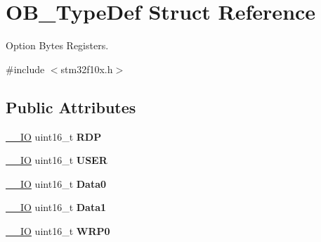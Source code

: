 \hypertarget{struct_o_b___type_def}{\section{O\-B\-\_\-\-Type\-Def Struct Reference}
\label{struct_o_b___type_def}
}


Option Bytes Registers.  




{\ttfamily \#include $<$stm32f10x.\-h$>$}

\subsection*{Public Attributes}
\begin{DoxyCompactItemize}
\item 
\hypertarget{struct_o_b___type_def_ad9f9ae594003c39cc27f147e29a130bb}{\hyperlink{group___c_m_s_i_s__core__definitions_gaec43007d9998a0a0e01faede4133d6be}{\-\_\-\-\_\-\-I\-O} uint16\-\_\-t {\bfseries R\-D\-P}}\label{struct_o_b___type_def_ad9f9ae594003c39cc27f147e29a130bb}

\item 
\hypertarget{struct_o_b___type_def_ab0292062a80446c97dac24604bd8ed8e}{\hyperlink{group___c_m_s_i_s__core__definitions_gaec43007d9998a0a0e01faede4133d6be}{\-\_\-\-\_\-\-I\-O} uint16\-\_\-t {\bfseries U\-S\-E\-R}}\label{struct_o_b___type_def_ab0292062a80446c97dac24604bd8ed8e}

\item 
\hypertarget{struct_o_b___type_def_a7570c0ba4b4d31c6061d595279e6b36e}{\hyperlink{group___c_m_s_i_s__core__definitions_gaec43007d9998a0a0e01faede4133d6be}{\-\_\-\-\_\-\-I\-O} uint16\-\_\-t {\bfseries Data0}}\label{struct_o_b___type_def_a7570c0ba4b4d31c6061d595279e6b36e}

\item 
\hypertarget{struct_o_b___type_def_a4e0e4a89db7004fb08a8a19129e9970e}{\hyperlink{group___c_m_s_i_s__core__definitions_gaec43007d9998a0a0e01faede4133d6be}{\-\_\-\-\_\-\-I\-O} uint16\-\_\-t {\bfseries Data1}}\label{struct_o_b___type_def_a4e0e4a89db7004fb08a8a19129e9970e}

\item 
\hypertarget{struct_o_b___type_def_acee93898f092604a871e52d64560e7a9}{\hyperlink{group___c_m_s_i_s__core__definitions_gaec43007d9998a0a0e01faede4133d6be}{\-\_\-\-\_\-\-I\-O} uint16\-\_\-t {\bfseries W\-R\-P0}}\label{struct_o_b___type_def_acee93898f092604a871e52d64560e7a9}


\end{DoxyCompactItemize}
